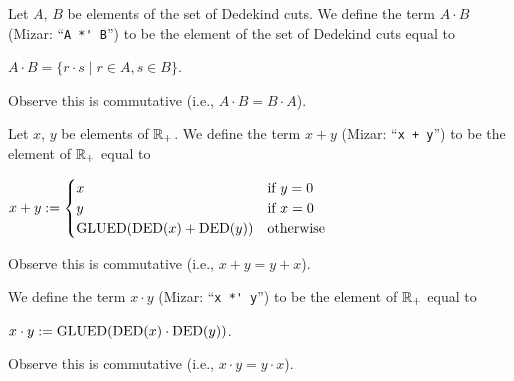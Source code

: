 \documentclass{article}
\begin{document}
\begin{definition}
Let $A$, $B$ be elements of the set of Dedekind cuts.
We define the term $A \cdot B$ (Mizar: ``\verb#A *' B#'') to be the element
of the set of Dedekind cuts equal to
\begin{defn}
\item $A \cdot B = \{r \cdot s\mid r\in A,s\in B\}$.
\end{defn}
Observe this is commutative (i.e., $A\cdot B=B\cdot A$).
\end{definition}

\begin{definition}
Let $x$, $y$ be elements of $\mathbb{R}_{+}$.
We define the term $x + y$ (Mizar: ``\verb#x + y#'') to be the element
of $\mathbb{R}_{+}$ equal to
\begin{defn}
\item $\displaystyle x+y:=\begin{cases}x & \mbox{if }y=0\\
  y & \mbox{if }x=0\\
  \mbox{GLUED}(\operatorname{DED}(x)+\operatorname{DED}(y)) & \mbox{otherwise}
\end{cases}$
\end{defn}
Observe this is commutative (i.e., $x+y=y+x$).

We define the term $x\cdot y$ (Mizar: ``\verb#x *' y#'') to be the
element of $\mathbb{R}_{+}$ equal to
\begin{defn}
\item $x\cdot y:=\mbox{GLUED}(\operatorname{DED}(x)\cdot\operatorname{DED}(y))$.
\end{defn}
Observe this is commutative (i.e., $x\cdot y=y\cdot x$).
\end{definition}
\end{document}
